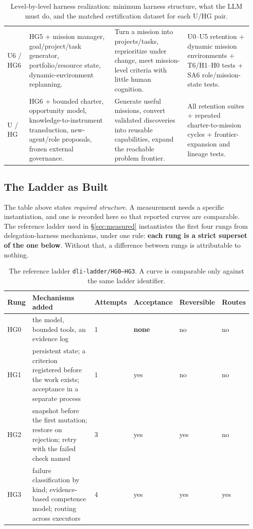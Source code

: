 \begin{table}[!htbp]
\begin{tabularx}{\textwidth}{@{}p{}ZZZ@{}}
U6 / HG6 & HG5 + mission manager, goal/project/task generator, portfolio/resource state, dynamic-environment replanning. & Turn a mission into projects/tasks, reprioritize under change, meet mission-level criteria with little human cognition. & U0--U5 retention + dynamic mission environments + T6/H1--H0 tests + SA6 role/mission-state tests. \\
U\Om{} / HG\Om{} & HG6 + bounded charter, opportunity model, knowledge-to-instrument transduction, new-agent/role proposals, frozen external governance. & Generate useful missions, convert validated discoveries into reusable capabilities, expand the reachable problem frontier. & All retention suites + repeated charter-to-mission cycles + frontier-expansion and lineage tests. \\
\bottomrule
\end{tabularx}
\caption{Level-by-level harness realization: minimum harness structure, what the LLM must do, and the matched certification dataset for each U/HG pair.}
\label{tab:levelbylevel}
\end{table}

\subsection{The Ladder as Built}\label{sec:built}

The table above states \emph{required structure}. A measurement needs a specific instantiation, and one is recorded here so that reported curves are comparable. The reference ladder used in \S\ref{sec:measured} instantiates the first four rungs from delegation-harness mechanisms, under one rule: \textbf{each rung is a strict superset of the one below}. Without that, a difference between rungs is attributable to nothing.

\begin{table}[!htbp]
\centering\small
\begin{tabularx}{\textwidth}{@{}lYllll@{}}
\toprule
Rung & Mechanisms added & Attempts & Acceptance & Reversible & Routes \\
\midrule
HG0 & the model, bounded tools, an evidence log & 1 & \textbf{none} & no & no \\
HG1 & persistent state; a criterion registered before the work exists; acceptance in a separate process & 1 & yes & no & no \\
HG2 & snapshot before the first mutation; restore on rejection; retry with the failed check named & 3 & yes & yes & no \\
HG3 & failure classification by kind; evidence-based competence model; routing across executors & 4 & yes & yes & yes \\
\bottomrule
\end{tabularx}
\caption{The reference ladder \texttt{dli-ladder/HG0--HG3}. A curve is comparable only against the same ladder identifier.}
\label{tab:ladder}
\end{table}

